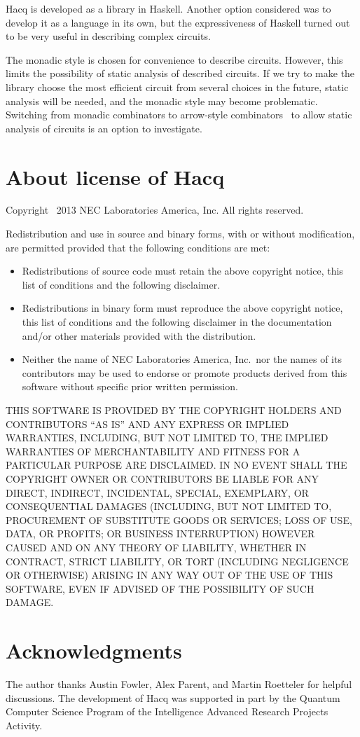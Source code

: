 \documentclass[11pt]{article}
\begin{document}
Hacq is developed as a library in Haskell.
Another option considered was to develop it as a language in its own,
but the expressiveness of Haskell turned out to be very useful
in describing complex circuits.

The monadic style is chosen for convenience to describe circuits.
However, this limits the possibility of static analysis of described circuits.
If we try to make the library choose the most efficient circuit from several choices
in the future,
static analysis will be needed, and the monadic style may become problematic.
Switching from monadic combinators to arrow-style combinators~\cite{SwiDup96AFP,Hughes00SCP}
to allow static analysis of circuits is an option to investigate.

\section*{About license of Hacq}

Copyright \textcopyright\ 2013 NEC Laboratories America, Inc.
All rights reserved.

Redistribution and use in source and binary forms, with or without
modification, are permitted provided that the following conditions are
met:
\begin{itemize}
\item
  Redistributions of source code must retain the above copyright
  notice, this list of conditions and the following disclaimer.
\item
  Redistributions in binary form must reproduce the above
  copyright notice, this list of conditions and the following
  disclaimer in the documentation and/or other materials provided
  with the distribution.
\item
  Neither the name of NEC Laboratories America, Inc.\ nor the names
  of its contributors may be used to endorse or promote products
  derived from this software without specific prior written
  permission.
\end{itemize}

THIS SOFTWARE IS PROVIDED BY THE COPYRIGHT HOLDERS AND CONTRIBUTORS
``AS IS'' AND ANY EXPRESS OR IMPLIED WARRANTIES\@, INCLUDING\@, BUT NOT
LIMITED TO\@, THE IMPLIED WARRANTIES OF MERCHANTABILITY AND FITNESS FOR
A PARTICULAR PURPOSE ARE DISCLAIMED\@.  IN NO EVENT SHALL THE COPYRIGHT
OWNER OR CONTRIBUTORS BE LIABLE FOR ANY DIRECT\@, INDIRECT\@, INCIDENTAL\@,
SPECIAL\@, EXEMPLARY\@, OR CONSEQUENTIAL DAMAGES (INCLUDING\@, BUT NOT
LIMITED TO\@, PROCUREMENT OF SUBSTITUTE GOODS OR SERVICES\@; LOSS OF USE\@,
DATA\@, OR PROFITS\@; OR BUSINESS INTERRUPTION) HOWEVER CAUSED AND ON ANY
THEORY OF LIABILITY\@, WHETHER IN CONTRACT\@, STRICT LIABILITY\@, OR TORT
(INCLUDING NEGLIGENCE OR OTHERWISE) ARISING IN ANY WAY OUT OF THE USE
OF THIS SOFTWARE\@, EVEN IF ADVISED OF THE POSSIBILITY OF SUCH DAMAGE.

\section*{Acknowledgments}

The author thanks Austin Fowler, Alex Parent, and Martin Roetteler for helpful discussions.
The development of Hacq was supported in part by the Quantum Computer Science Program
of the Intelligence Advanced Research Projects Activity.


\end{document}
